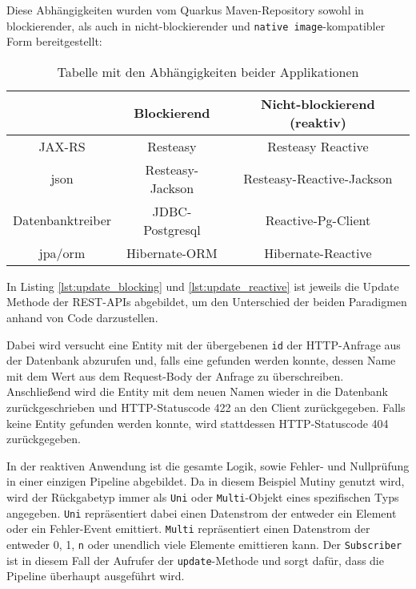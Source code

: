 Diese Abhängigkeiten wurden vom Quarkus Maven-Repository sowohl in blockierender,
als auch in nicht-blockierender und \verb|native image|-kompatibler Form bereitgestellt: \parencite{MavenQuarkusIO}
\setlength{\tabcolsep}{18pt}
\renewcommand{\arraystretch}{1.5}
\begin{table}[ht!]
  \centering
  \begin{tabular}{| c | c | c |}
    \hline
                                  & Blockierend      & Nicht-blockierend (reaktiv) \\
    \hline
    JAX-RS                        & Resteasy         & Resteasy Reactive           \\
    \hline
    \acrshort{json}               & Resteasy-Jackson & Resteasy-Reactive-Jackson   \\
    \hline
    Datenbanktreiber              & JDBC-Postgresql  & Reactive-Pg-Client          \\
    \hline
    \acrshort{jpa}/\acrshort{orm} & Hibernate-ORM    & Hibernate-Reactive          \\
    \hline
  \end{tabular}
  \caption{Tabelle mit den Abhängigkeiten beider Applikationen}
  \label{table:dependencies}
\end{table}

In Listing \ref{lst:update_blocking} und \ref{lst:update_reactive} ist jeweils die Update Methode der REST-APIs abgebildet, um den
Unterschied der beiden Paradigmen anhand von Code darzustellen.

Dabei wird versucht eine Entity mit der übergebenen \verb|id| der HTTP-Anfrage
aus der Datenbank abzurufen und, falls eine gefunden werden konnte, dessen Name mit dem Wert
aus dem Request-Body der Anfrage zu überschreiben. Anschließend wird die Entity mit dem neuen Namen wieder in die Datenbank zurückgeschrieben
und HTTP-Statuscode 422 an den Client zurückgegeben. Falls keine Entity gefunden werden konnte, wird stattdessen
HTTP-Statuscode 404 zurückgegeben.

In der reaktiven Anwendung ist die gesamte Logik, sowie Fehler- und Nullprüfung in einer einzigen Pipeline abgebildet.
Da in diesem Beispiel Mutiny genutzt wird, wird der Rückgabetyp immer als \verb|Uni| oder \verb|Multi|-Objekt eines spezifischen Typs
angegeben. \verb|Uni| repräsentiert dabei einen Datenstrom der entweder ein Element oder ein Fehler-Event emittiert.
\verb|Multi| repräsentiert einen Datenstrom der entweder 0, 1, \verb|n| oder unendlich viele Elemente emittieren kann.
Der \verb|Subscriber| ist in diesem Fall der Aufrufer der \verb|update|-Methode und sorgt dafür, dass die Pipeline überhaupt ausgeführt wird.


